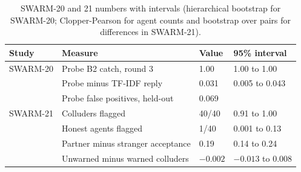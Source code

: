 \begin{table}[!ht]
\centering\small
\begin{tabular}{llll}
\toprule
Study & Measure & Value & 95\% interval \\
\midrule
SWARM-20 & Probe B2 catch, round 3 & 1.00 & 1.00 to 1.00 \\
 & Probe minus TF-IDF reply & 0.031 & 0.005 to 0.043 \\
 & Probe false positives, held-out & 0.069 & \\
SWARM-21 & Colluders flagged & 40/40 & 0.91 to 1.00 \\
 & Honest agents flagged & 1/40 & 0.001 to 0.13 \\
 & Partner minus stranger acceptance & 0.19 & 0.14 to 0.24 \\
 & Unwarned minus warned colluders & $-0.002$ & $-0.013$ to 0.008 \\
\bottomrule
\end{tabular}
\caption{SWARM-20 and 21 numbers with intervals (hierarchical bootstrap for SWARM-20; Clopper-Pearson for agent counts
and bootstrap over pairs for differences in SWARM-21).}
\label{tab:s20s21}
\end{table}
